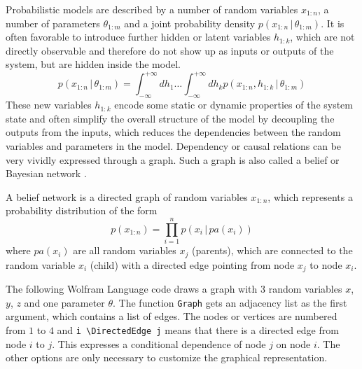 \documentclass{tstextbook}
\begin{document}
Probabilistic models are described by a number of random variables $x_{1:n}$, a number of parameters $\theta_{1:m}$ and a joint probability density $p(x_{1:n}\,\vert\, \theta_{1:m})$. It is often favorable to introduce further hidden or latent variables $h_{1:k}$, which are not directly observable and therefore do not show up as inputs or outputs of the system, but are hidden inside the model.
\begin{equation}
p(x_{1:n}\,\vert\, \theta_{1:m})=\int_{-\infty}^{+\infty}dh_{1}\ldots \int_{-\infty}^{+\infty}dh_{k} p(x_{1:n},h_{1:k}\,\vert\, \theta_{1:m})
\end{equation}
These new variables $h_{1:k}$ encode some static or dynamic properties of the system state and often simplify the overall structure of the model by decoupling the outputs from the inputs, which reduces the dependencies between the random variables and parameters in the model. Dependency or causal relations can be very vividly expressed through a graph. Such a graph is also called a belief or Bayesian network \cite{barber2011} \cite{koller2009}.

\begin{definition}
  \label{th:beliefnetwork}
  A belief network is a directed graph of random variables $x_{1:n}$, which represents a probability distribution of the form
  \begin{equation}
    p(x_{1:n})=\prod_{i=1}^{n}p\left(x_i\,\vert\, pa(x_i)\right)
  \end{equation}
  where $pa(x_i)$ are all random variables $x_j$ (parents), which are connected to the random variable $x_i$ (child) with a directed edge pointing from node $x_j$ to node $x_i$.
\end{definition}

The following Wolfram Language code draws a graph with 3 random variables $x$, $y$, $z$ and one parameter $\theta$. The function \texttt{Graph} gets an adjacency list as the first argument, which contains a list of edges. The nodes or vertices are numbered from $1$ to $4$ and \texttt{i \textbackslash\lbrack DirectedEdge\rbrack \,j} means that there is a directed edge from node $i$ to $j$. This expresses a conditional dependence of node $j$ on node $i$. The other options are only necessary to customize the graphical representation.\\
\end{document}
